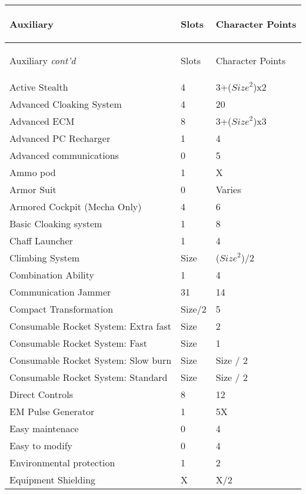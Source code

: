 \documentclass[twoside]{book}
\begin{document}
\begin{longtable}{p{1.25in}ll} 
  Auxiliary& \begin{turn}{70}{Slots}\end{turn}
          & \begin{turn}{70}{Character Points}\end{turn}
          \\
  \hline
  \hline
  \endfirsthead
  Auxiliary \textit{cont'd}
        & \begin{turn}{70}{Slots}\end{turn}
          & \begin{turn}{70}{Character Points}\end{turn}
           \\
  \hline
  \endhead
\raggedright Active Stealth&4&3+(\begin{math}{Size}^{2}\end{math})x2\tabularnewline
      \raggedright Advanced Cloaking System&4&20\tabularnewline
      \raggedright Advanced ECM&8&3+(\begin{math}{Size}^{2}\end{math})x3\tabularnewline
      \raggedright Advanced PC Recharger&1&4\tabularnewline
      \raggedright Advanced communications&0&5\tabularnewline
      \raggedright Ammo pod&1&X\tabularnewline
      \raggedright Armor Suit&0&Varies\tabularnewline
      \raggedright Armored Cockpit (Mecha Only)&4&6\tabularnewline
      \raggedright Basic Cloaking system&1&8\tabularnewline
      \raggedright Chaff Launcher&1&4\tabularnewline
      \raggedright Climbing System&Size&(\begin{math}{Size}^{2}\end{math})/2\tabularnewline
      \raggedright Combination Ability&1&4\tabularnewline
      \raggedright Communication Jammer&31&14\tabularnewline
      \raggedright Compact Transformation&Size/2&5\tabularnewline
      \raggedright Consumable Rocket System: Extra fast&Size&2\tabularnewline
      \raggedright Consumable Rocket System: Fast&Size&1\tabularnewline
      \raggedright Consumable Rocket System: Slow burn&Size&Size / 2\tabularnewline
      \raggedright Consumable Rocket System: Standard&Size&Size / 2\tabularnewline
      \raggedright Direct Controls&8&12\tabularnewline
      \raggedright EM Pulse Generator&1&5X\tabularnewline
      \raggedright Easy maintenace&0&4\tabularnewline
      \raggedright Easy to modify&0&4\tabularnewline
      \raggedright Environmental protection&1&2\tabularnewline
      \raggedright Equipment Shielding&X&X/2\tabularnewline

\end{longtable}
\end{document}
